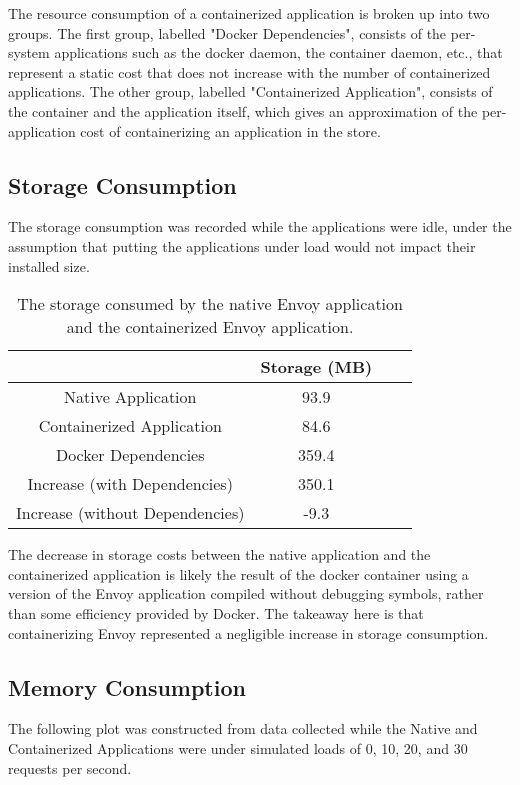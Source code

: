 \documentclass{article}
\begin{document}
The resource consumption of a containerized application is broken up into two groups. The first group, labelled "Docker Dependencies", consists of the per-system applications such as the docker daemon, the container daemon, etc., that represent a static cost that does not increase with the number of containerized applications. The other group, labelled "Containerized Application", consists of the container and the application itself, which gives an approximation of the per-application cost of containerizing an application in the store.

\subsection{Storage Consumption}
The storage consumption was recorded while the applications were idle, under the assumption that putting the applications under load would not impact their installed size.

\begin{table}[H]
\begin{tabular}{ |c|c|c|c| }
 \hline
   & Storage (MB)\\ 
 \hline
 Native Application & 93.9 \\
 \hline
 Containerized Application & 84.6 \\
 \hline
 Docker Dependencies & 359.4\\
 \hline\hline
 Increase (with Dependencies) & 350.1 \\
 \hline
 Increase (without Dependencies) & -9.3 \\
 \hline
\end{tabular}
\caption{The storage consumed by the native Envoy application and the containerized Envoy application.}
\label{storage-consumption}
\end{table}

The decrease in storage costs between the native application and the containerized application is likely the result of the docker container using a version of the Envoy application compiled without debugging symbols, rather than some efficiency provided by Docker. The takeaway here is that containerizing Envoy represented a negligible increase in storage consumption.

\subsection{Memory Consumption}
The following plot was constructed from data collected while the Native and Containerized Applications were under simulated loads of 0, 10, 20, and 30 requests per second.
\end{document}
